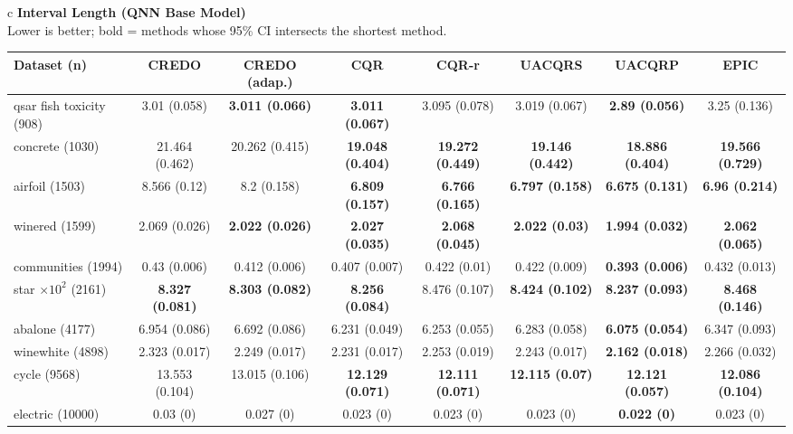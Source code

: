 \documentclass[border=6pt]{standalone}
\begin{document}
\begin{adjustbox}{max width=\linewidth}
\begin{tabular}{c}
{\small\textbf{Interval Length (QNN Base Model)}}\\[-1pt]
{\scriptsize Lower is better; bold = methods whose 95\% CI intersects the shortest method.}\\[2pt]
\scriptsize\begin{tabular}{lccccccc}
\hline
Dataset (n) & \textbf{CREDO} & \textbf{CREDO (adap.)} & \textbf{CQR} & \textbf{CQR-r} & \textbf{UACQRS} & \textbf{UACQRP} & \textbf{EPIC}\\ \hline
qsar fish toxicity (908) & 3.01 (0.058) & \textbf{3.011 (0.066)} & \textbf{3.011 (0.067)} & 3.095 (0.078) & 3.019 (0.067) & \textbf{2.89 (0.056)} & 3.25 (0.136)\\
concrete (1030) & 21.464 (0.462) & 20.262 (0.415) & \textbf{19.048 (0.404)} & \textbf{19.272 (0.449)} & \textbf{19.146 (0.442)} & \textbf{18.886 (0.404)} & \textbf{19.566 (0.729)}\\
airfoil (1503) & 8.566 (0.12) & 8.2 (0.158) & \textbf{6.809 (0.157)} & \textbf{6.766 (0.165)} & \textbf{6.797 (0.158)} & \textbf{6.675 (0.131)} & \textbf{6.96 (0.214)}\\
winered (1599) & 2.069 (0.026) & \textbf{2.022 (0.026)} & \textbf{2.027 (0.035)} & \textbf{2.068 (0.045)} & \textbf{2.022 (0.03)} & \textbf{1.994 (0.032)} & \textbf{2.062 (0.065)}\\
communities (1994) & 0.43 (0.006) & 0.412 (0.006) & 0.407 (0.007) & 0.422 (0.01) & 0.422 (0.009) & \textbf{0.393 (0.006)} & 0.432 (0.013)\\
star $\times 10^2$ (2161) & \textbf{8.327 (0.081)} & \textbf{8.303 (0.082)} & \textbf{8.256 (0.084)} & 8.476 (0.107) & \textbf{8.424 (0.102)} & \textbf{8.237 (0.093)} & \textbf{8.468 (0.146)}\\
abalone (4177) & 6.954 (0.086) & 6.692 (0.086) & 6.231 (0.049) & 6.253 (0.055) & 6.283 (0.058) & \textbf{6.075 (0.054)} & 6.347 (0.093)\\
winewhite (4898) & 2.323 (0.017) & 2.249 (0.017) & 2.231 (0.017) & 2.253 (0.019) & 2.243 (0.017) & \textbf{2.162 (0.018)} & 2.266 (0.032)\\
cycle (9568) & 13.553 (0.104) & 13.015 (0.106) & \textbf{12.129 (0.071)} & \textbf{12.111 (0.071)} & \textbf{12.115 (0.07)} & \textbf{12.121 (0.057)} & \textbf{12.086 (0.104)}\\
electric (10000) & 0.03 (0) & 0.027 (0) & 0.023 (0) & 0.023 (0) & 0.023 (0) & \textbf{0.022 (0)} & 0.023 (0)\\

\end{tabular}
\end{tabular}
\end{adjustbox}
\end{document}
